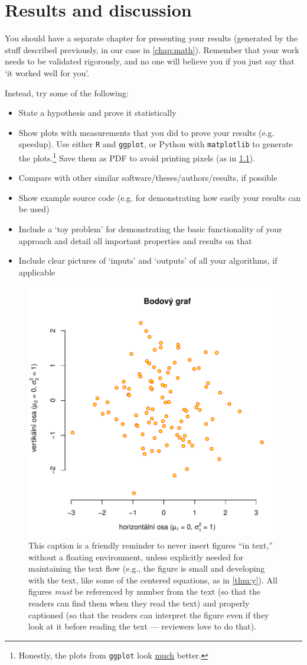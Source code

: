 \chapter{Results and discussion}

You should have a separate chapter for presenting your results (generated by the stuff described previously, in our case in \cref{chap:math}). Remember that your work needs to be validated rigorously, and no one will believe you if you just say that `it worked well for you'.

Instead, try some of the following:
\begin{itemize}
\item State a hypothesis and prove it statistically
\item Show plots with measurements that you did to prove your results (e.g. speedup). Use either \texttt{R} and \texttt{ggplot}, or Python with \texttt{matplotlib} to generate the plots.\footnote{Honestly, the plots from \texttt{ggplot} look \underline{much} better.} Save them as PDF to avoid printing pixels (as in \cref{fig:f}).
\item Compare with other similar software/theses/authors/results, if possible
\item Show example source code (e.g. for demonstrating how easily your results can be used)
\item Include a `toy problem' for demonstrating the basic functionality of your approach and detail all important properties and results on that
\item Include clear pictures of `inputs' and `outputs' of all your algorithms, if applicable
\end{itemize}

\begin{figure}
\centering
\includegraphics[width=.6\linewidth]{img/ukazka-obr01.pdf}
\caption{This caption is a friendly reminder to never insert figures ``in text,'' without a floating environment, unless explicitly needed for maintaining the text flow (e.g., the figure is small and developing with the text, like some of the centered equations, as in \cref{thm:y}). All figures \emph{must} be referenced by number from the text (so that the readers can find them when they read the text) and properly captioned (so that the readers can interpret the figure even if they look at it before reading the text --- reviewers love to do that).}
\label{fig:f}
\end{figure}

